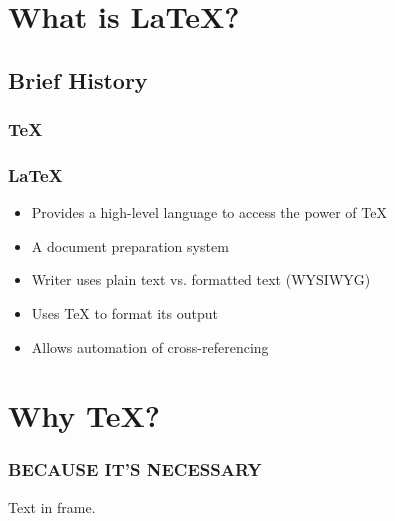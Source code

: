 \documentclass{beamer}
\begin{document}
\section{What is \LaTeX?}
\subsection{Brief History}
\begin{frame}
	\frametitle{TeX}
\end{frame}
\begin{frame}
    \frametitle{\LaTeX}
    \begin{itemize}
        \item Provides a high-level language to access the power of TeX
        \item A document preparation system
        \item Writer uses plain text vs. formatted text (WYSIWYG)
        \item Uses TeX to format its output
        \item Allows automation of cross-referencing
    \end{itemize}
\end{frame}

\section{Why TeX?}
\begin{frame}
	\frametitle{BECAUSE IT'S NECESSARY}
	Text in frame.
\end{frame}
\end{document}
